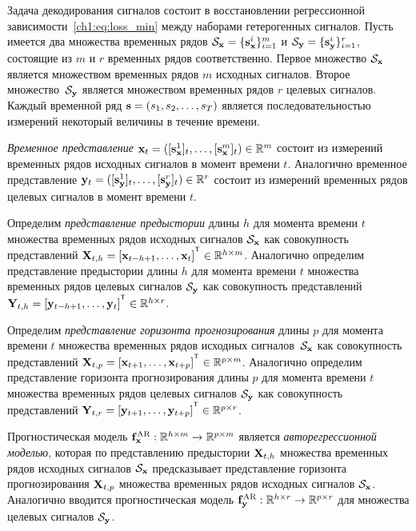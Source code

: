 \documentclass[11pt, a5paper]{dissert}
\begin{document}
Задача декодирования сигналов состоит в восстановлении регрессионной зависимости~\eqref{ch1:eq:loss_min} между наборами гетерогенных сигналов.
Пусть имеется два множества временных рядов $\mathcal{S}_{\mathbf{x}} = \{\mathbf{s}_{\mathbf{x}}^i\}_{i=1}^m$ и $\mathcal{S}_{\mathbf{y}} = \{\mathbf{s}_{\mathbf{y}}^i\}_{i=1}^r$, состоящие из $m$ и $r$ временных рядов соответственно. 
Первое множество $\mathcal{S}_{\mathbf{x}}$ является множеством временных рядов $m$ исходных сигналов. 
Второе множество~$\mathcal{S}_{\mathbf{y}}$ является множеством временных рядов $r$ целевых сигналов.
Каждый временной ряд $\mathbf{s} = (s_1, s_2, \dots, s_T)$ является последовательностью измерений некоторый величины в течение времени. 
\begin{definition}
	 \textit{Временное представление} $\mathbf{x}_t = ([\mathbf{s}_{\mathbf{x}}^1]_t, \dots, [\mathbf{s}_{\mathbf{x}}^m]_t) \in \mathbb{R}^m$ состоит из измерений временных рядов исходных сигналов в момент времени $t$. 
	Аналогично временное представление $\mathbf{y}_t = ([\mathbf{s}_{\mathbf{y}}^1]_t, \dots, [\mathbf{s}_{\mathbf{y}}^r]_t) \in \mathbb{R}^r$ состоит из измерений временных рядов целевых сигналов в момент времени $t$.
\end{definition}
\begin{definition}
	Определим \textit{представление предыстории} длины $h$ для момента времени $t$ множества временных рядов исходных сигналов $\mathcal{S}_{\mathbf{x}}$ как совокупность представлений $\bX_{t,h} = [\bx_{t - h + 1}, \dots, \bx_{t}]^{\T} \in \bbR^{h \times m}$.
	Аналогично определим представление предыстории длины $h$ для момента времени $t$ множества временных рядов целевых сигналов $\mathcal{S}_{\mathbf{y}}$ как совокупность представлений $\bY_{t,h} = [\by_{t - h + 1}, \dots, \by_{t}]^{\T} \in \bbR^{h \times r}$.
\end{definition}
\begin{definition}
	Определим \textit{представление горизонта прогнозирования} длины $p$ для момента времени $t$ множества временных рядов исходных сигналов~$\mathcal{S}_{\mathbf{x}}$ как совокупность представлений $\bX_{t,p} = [\bx_{t + 1}, \dots, \bx_{t + p}]^{\T} \in \bbR^{p \times m}$.
	Аналогично определим представление горизонта прогнозирования длины $p$ для момента времени $t$ множества временных рядов целевых сигналов $\mathcal{S}_{\mathbf{y}}$ как совокупность представлений $\bY_{t,r} = [\by_{t + 1}, \dots, \by_{t + p}]^{\T} \in \bbR^{p \times r}$.
\end{definition}

\begin{definition}
	\label{ch1:def:autoreg_model}
	Прогностическая модель $\mathbf{f}^{\text{AR}}_{\mathbf{x}}: \mathbb{R}^{h \times m} \rightarrow \mathbb{R}^{p \times m}$ является \textit{авторегрессионной моделью}, которая по представлению предыстории $\mathbf{X}_{t,h}$ множества временных рядов исходных сигналов $\mathcal{S}_{\mathbf{x}}$ предсказывает представление горизонта прогнозирования $\mathbf{X}_{t,p}$ множества временных рядов исходных сигналов $\mathcal{S}_{\mathbf{x}}$.
	Аналогично вводится прогностическая модель $\mathbf{f}^{\text{AR}}_{\mathbf{y}}: \mathbb{R}^{h \times r} \rightarrow \mathbb{R}^{p \times r}$ для множества целевых сигналов $\mathcal{S}_{\mathbf{y}}$.
\end{definition}
\end{document}
